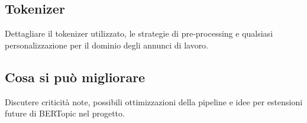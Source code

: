 \subsection{Tokenizer}
Dettagliare il tokenizer utilizzato, le strategie di pre-processing e qualsiasi personalizzazione per il dominio degli annunci di lavoro.

\subsection{Cosa si può migliorare}
Discutere criticità note, possibili ottimizzazioni della pipeline e idee per estensioni future di BERTopic nel progetto.
